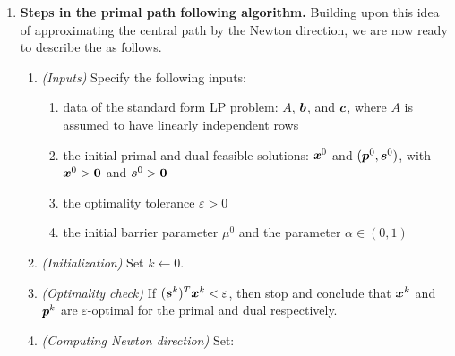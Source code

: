 \begin{enumerate}
\begin{center}
\end{center}
\item \textbf{Steps in the primal path following algorithm.} Building upon this
idea of approximating the central path by the Newton direction, we are now
ready to describe the  as follows.
\begin{enumerate}[label={(\arabic*)}]
\item \emph{(Inputs)} Specify the following inputs:
\begin{enumerate}
\item data of the standard form LP problem: \(A\), \(\bm{b}\), and
\(\bm{c}\), where \(A\) is assumed to have linearly independent rows
\item the initial primal and dual feasible solutions: \(\bm{x}^{0}\) and
\((\bm{p}^{0},\bm{s}^{0})\), with \(\bm{x}^{0}>\bm{0}\) and
\(\bm{s}^{0}>\bm{0}\)
\item the optimality tolerance \(\varepsilon>0\)
\item the initial barrier parameter \(\mu^{0}\) and the parameter \(\alpha\in
(0,1)\)
\end{enumerate}
\item \emph{(Initialization)} Set \(k\leftarrow 0\).
\item \emph{(Optimality check)} If
\((\bm{s}^{k})^{T}\bm{x}^{k}<\varepsilon\),  then stop and conclude that
\(\bm{x}^{k}\) and \(\bm{p}^{k}\) are \(\varepsilon\)-optimal for the
primal and dual respectively.
\item \emph{(Computing Newton direction)} Set:
\end{enumerate}
\end{enumerate}
